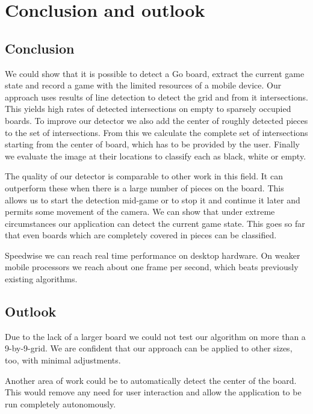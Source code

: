 
\chapter{Conclusion and outlook}
\section{Conclusion}
We could show that it is possible to detect a Go board, extract the current game state and record a game with the limited resources of a mobile device. Our approach uses results of line detection to detect the grid and from it intersections. This yields high rates of detected intersections on empty to sparsely occupied boards. To improve our detector we also add the center of roughly detected pieces to the set of intersections. From this we calculate the complete set of intersections starting from the center of board, which has to be provided by the user. Finally we evaluate the image at their locations to classify each as black, white or empty.

The quality of our detector is comparable to other work in this field. It can outperform these when there is a large number of pieces on the board. This allows us to start the detection mid-game or to stop it and continue it later and permits some movement of the camera. We can show that under extreme circumstances our application can detect the current game state. This goes so far that even boards which are completely covered in pieces can be classified.

Speedwise we can reach real time performance on desktop hardware. On weaker mobile processors we reach about one frame per second, which beats previously existing algorithms.

\section{Outlook}
Due to the lack of a larger board we could not test our algorithm on more than a 9-by-9-grid. We are confident that our approach can be applied to other sizes, too, with minimal adjustments.

Another area of work could be to automatically detect the center of the board. This would remove any need for user interaction and allow the application to be run completely autonomously.
